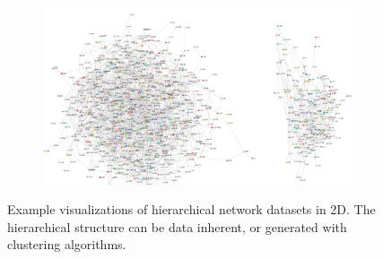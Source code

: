 \begin{figure}[h]
\begin{subfigure}[b]{0.5\columnwidth}
      \label{fig:original2DdiseaseNet}
    \end{subfigure}
    \begin{subfigure}[b]{0.7\columnwidth}
      \centering
      \includegraphics[width=\textwidth]{graphics/classic2DGraph.png}
      \label{fig:2dHierarchicalClutter}
    \end{subfigure}
    \caption[Visualizations of hierarchical network datasets.]{Example visualizations of hierarchical network datasets in 2D. The hierarchical structure can be data inherent, or generated with clustering algorithms.}
    \label{fig:intro} 
  \end{figure}

